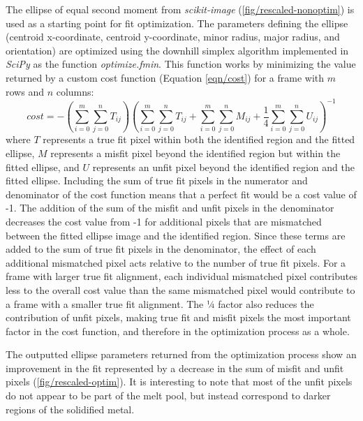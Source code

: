 The ellipse of equal second moment from \textit{scikit-image}
(\ref{fig/rescaled-nonoptim}) is used
as a starting point for fit optimization. The parameters defining the
ellipse (centroid x-coordinate, centroid y-coordinate, minor radius, major
radius, and orientation) are optimized using the downhill simplex
algorithm \cite{Nelder1965} implemented in \textit{SciPy} as the function
\textit{optimize.fmin}.
This function works by minimizing the value returned by a custom cost
function (Equation \ref{eqn/cost}) for a frame with $m$ rows and $n$
columns:
\begin{equation} \label{eqn/cost}
    cost =
    - \left(
        \sum_{i = 0}^{m}\sum_{j = 0}^{n} T_{ij}
    \right)
    \left(
        \sum_{i = 0}^{m}\sum_{j = 0}^{n} T_{ij}
        + \sum_{i = 0}^{m}\sum_{j = 0}^{n} M_{ij}
        + \frac{1}{4} \sum_{i = 0}^{m}\sum_{j = 0}^{n} U_{ij}
    \right)^{-1}
\end{equation}
where
$T$ represents a true fit pixel within both the identified region and the
fitted ellipse,
$M$ represents a misfit pixel beyond the identified region but within
the fitted ellipse, and
$U$ represents an unfit pixel beyond the identified region and the
fitted ellipse.
Including the sum of true fit pixels in the numerator and denominator
of the cost function means that a perfect fit would be a cost value of -1.
The addition of the sum of the misfit and unfit pixels in
the denominator decreases the cost value from -1 for additional pixels
that are mismatched between the fitted ellipse image and the identified
region. Since these terms are added to the sum of true fit pixels in
the denominator, the effect of each additional mismatched pixel acts
relative to the number of true fit pixels. For a frame with
larger true fit alignment, each individual mismatched pixel
contributes less to the overall cost value than the same mismatched pixel
would contribute to a frame with a smaller true fit alignment. The ¼
factor also reduces the contribution of unfit pixels, making true fit and
misfit pixels the most important factor in the cost
function, and therefore in the optimization process as a whole.

The outputted ellipse
parameters returned from the optimization process show an improvement in
the fit represented by a decrease in the sum of misfit and unfit pixels
(\ref{fig/rescaled-optim}).
It is interesting to note that most of the
unfit pixels do not appear to be part of the melt pool, but
instead correspond to darker regions of the solidified metal.

